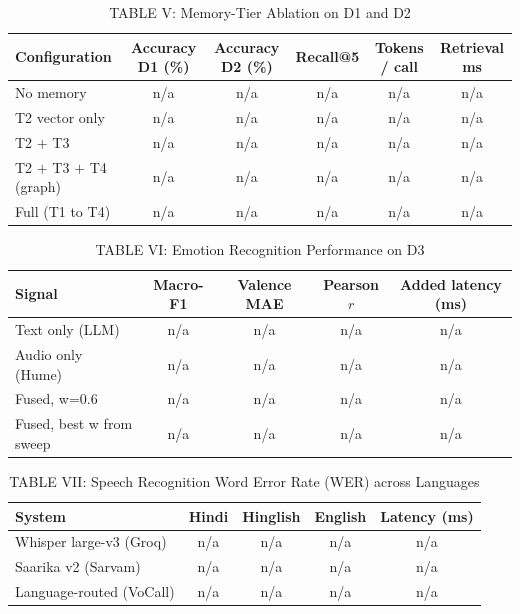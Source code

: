 \begin{table}[t]
\centering
\caption{TABLE V: Memory-Tier Ablation on D1 and D2}
\label{tab:memory_ablation}
\begin{tabular}{lccccc}
\toprule
Configuration & Accuracy D1 (\%) & Accuracy D2 (\%) & Recall@5 & Tokens / call & Retrieval ms \\
\midrule
No memory & n/a & n/a & n/a & n/a & n/a \\
T2 vector only & n/a & n/a & n/a & n/a & n/a \\
T2 $+$ T3 & n/a & n/a & n/a & n/a & n/a \\
T2 $+$ T3 $+$ T4 (graph) & n/a & n/a & n/a & n/a & n/a \\
Full (T1 to T4) & n/a & n/a & n/a & n/a & n/a \\
\bottomrule
\end{tabular}
\end{table}

\begin{table}[t]
\centering
\caption{TABLE VI: Emotion Recognition Performance on D3}
\label{tab:emotion_recognition}
\begin{tabular}{lcccc}
\toprule
Signal & Macro-F1 & Valence MAE & Pearson $r$ & Added latency (ms) \\
\midrule
Text only (LLM) & n/a & n/a & n/a & n/a \\
Audio only (Hume) & n/a & n/a & n/a & n/a \\
Fused, w=0.6 & n/a & n/a & n/a & n/a \\
Fused, best w from sweep & n/a & n/a & n/a & n/a \\
\bottomrule
\end{tabular}
\end{table}

\begin{table}[t]
\centering
\caption{TABLE VII: Speech Recognition Word Error Rate (WER) across Languages}
\label{tab:speech_wer}
\begin{tabular}{lcccc}
\toprule
System & Hindi & Hinglish & English & Latency (ms) \\
\midrule
Whisper large-v3 (Groq) & n/a & n/a & n/a & n/a \\
Saarika v2 (Sarvam) & n/a & n/a & n/a & n/a \\
Language-routed (VoCall) & n/a & n/a & n/a & n/a \\
\bottomrule
\end{tabular}
\end{table}


